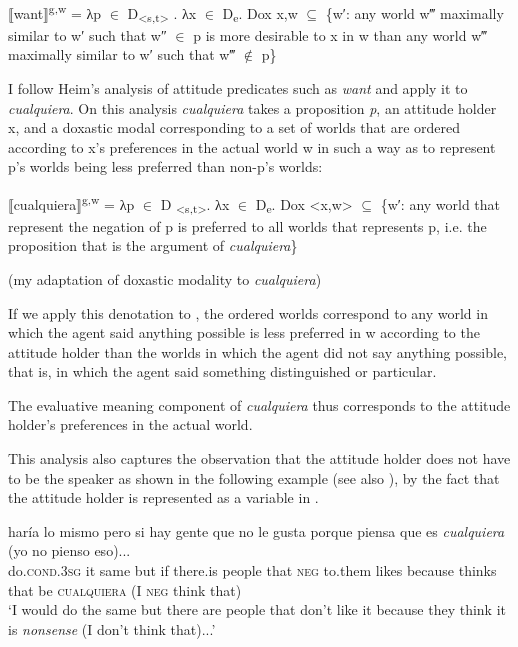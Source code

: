 \ea \label{ex:key:243} %
    ⟦want⟧\textsuperscript{g,w} = λp ${\in}$ D\textsubscript{<s,t>} . λx ${\in}$ D\textsubscript{e}. Dox x,w $\subseteq$ \{w′: any world w‴ maximally similar to w′ such that w″ ${\in}$ p is more desirable to x in w than any world w‴ maximally similar to w′ such that w‴ ${\notin}$ p\}

    \citep[193]{Heim1982}
\z

I follow Heim’s analysis of attitude predicates such as \textit{want} and apply it to \textit{cualquiera}. On this analysis \textit{cualquiera} takes a proposition \textit{p}, an attitude holder x, and a doxastic modal corresponding to a set of worlds that are ordered according to x’s preferences in the actual world w in such a way as to represent p’s worlds being less preferred than non-p’s worlds:

\ea \label{bkm:Ref150787526} %

⟦cualquiera⟧\textsuperscript{g,w} = λp ${\in}$ D \textsubscript{<s,t>}. λx ${\in}$ D\textsubscript{e}. Dox <x,w> $\subseteq$ \{w′: any world that represent the negation of p is preferred to all worlds that represents p, i.e. the proposition that is the argument of \textit{cualquiera}\}

    (my adaptation of  doxastic modality to \textit{cualquiera})
\z

If we apply this denotation to , the ordered worlds correspond to any world in which the agent said anything possible is less preferred in w according to the attitude holder than the worlds in which the agent did not say anything possible, that is, in which the agent said something distinguished or particular.

The evaluative meaning component of \textit{cualquiera} thus corresponds to the attitude holder’s preferences in the actual world.

This analysis also captures the observation that the attitude holder does not have to be the speaker as shown in the following example (see also ), by the fact that the attitude holder is represented as a variable in .

\ea \label{ex:key:245} %
    \gll haría lo mismo pero si hay gente que no le gusta porque piensa que es \textit{cualquiera} (yo no pienso eso)...\\
do.\textsc{cond.3sg} it same but if there.is people that \textsc{neg} to.them likes because thinks that be \textsc{cualquiera} (I \textsc{neg} think that)\\
    \glt ‘I would do the same but there are people that don’t like it because they think it is \textit{nonsense} (I don’t think that)...’

